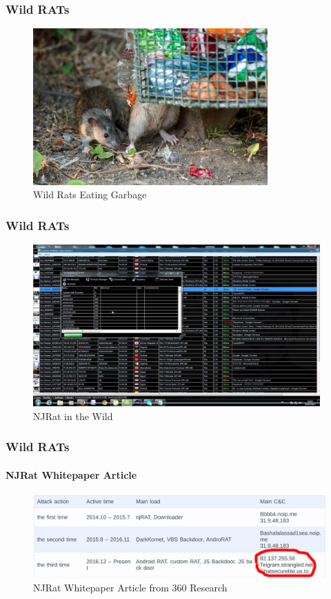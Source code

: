 \documentclass[aspectratio=169]{beamer}
\begin{document}
\begin{frame}
  \frametitle{Wild RATs}
  \begin{center}
    \begin{figure}
      \includegraphics[width=9cm,keepaspectratio]{wild_rat}
      \caption{Wild Rats Eating Garbage}
    \end{figure}
  \end{center}
\end{frame}

\begin{frame}
  \frametitle{Wild RATs}
  \begin{center}
    \begin{figure}
      \includegraphics[width=11cm,keepaspectratio]{njrat}
      \caption{NJRat in the Wild}
    \end{figure}
  \end{center}
\end{frame}

\begin{frame}
  \frametitle{Wild RATs}
  \framesubtitle{NJRat Whitepaper Article}
  \begin{center}
    \begin{figure}
      \includegraphics[width=12cm,keepaspectratio]{njrat_article}
      \caption{NJRat Whitepaper Article from 360 Research}
    \end{figure}
  \end{center}
\end{frame}
\end{document}
